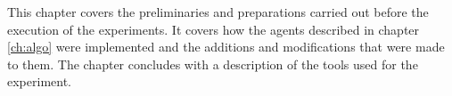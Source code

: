 This chapter covers the preliminaries and preparations carried out before the
execution of the experiments. It covers how the agents described in chapter
\ref{ch:algo} were implemented and the additions and modifications that were made to them. The chapter
concludes with a description of the tools used for the experiment.
